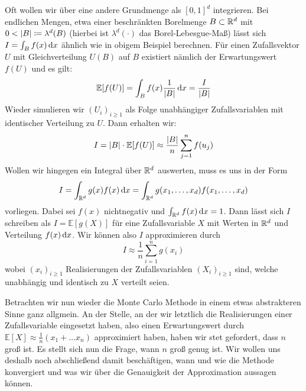  	Oft wollen wir über eine andere Grundmenge als $ [0,1]^d $ integrieren. 
 	Bei endlichen Mengen, etwa einer beschränkten Borelmenge $ B \subset \mathbb{R}^d $ mit $ 0 < | B | \coloneqq \lambda^d(B) $ (hierbei ist $ \lambda^d(\cdot) $ das Borel-Lebesgue-Maß) lässt sich $ I = \int_{B} f(x) \, \mathrm{d} x $ ähnlich wie in obigem Beispiel berechnen.
	Für einen Zufallsvektor $ U $ mit Gleichverteilung $ U(B) $ auf $ B $ existiert nämlich der Erwartungswert $ f(U) $ und es gilt:
	\[
		\mathbb{E}[f(U)] = \int_{B} f(x) \frac{1}{| B |} \, \mathrm{d} x = \frac{I}{| B |}
	\]
	Wieder simulieren wir $ (U_i)_{i \geq 1} $ als Folge unabhängiger Zufallsvariablen mit identischer Verteilung zu $ U $. Dann erhalten wir:
	\[
		I = | B | \cdot \mathbb{E}[f(U)] \approx \frac{| B |}{n} \sum_{j=1}^{n}f(u_j)
	\]
	 Wollen wir hingegen ein Integral über $ \mathbb{R}^d $ auswerten, muss es uns in der Form 
	\[
	I = \int_{\mathbb{R}^d} g(x)f(x) \, \mathrm{d} x = \int_{\mathbb{R}^d} g(x_1,\dots,x_d)f(x_1,\dots,x_d)
	\] 
	vorliegen. Dabei sei $ f(x) $ nichtnegativ und $ \int_{\mathbb{R}^d} f(x) \, \mathrm{d} x = 1 $.
	Dann lässt sich $ I $ schreiben als $ I = \mathbb{E}[g(X)] $ für eine Zufallsvariable $ X $ mit Werten in $ \mathbb{R}^d $ und Verteilung $ f(x) \, \mathrm{d} x $.
	Wir können also $ I $ approximieren durch
	\[
		I \approx \frac{1}{n}\sum_{i=1}^{n} g(x_i) 
	\]
	wobei $ (x_i)_{i \geq 1} $ Realisierungen der Zufallsvariablen $ (X_i)_{i \geq 1} $ sind, welche unabhängig und identisch zu $ X $ verteilt seien.
	
	Betrachten wir nun wieder die Monte Carlo Methode in einem etwas abstrakteren Sinne ganz allgmein.
	An der Stelle, an der wir letztlich die Realisierungen einer Zufallsvariable eingesetzt haben, also einen Erwartungswert durch $
	\mathbb{E}[X] \approx \frac{1}{n}(x_1 + \dots x_n)
	$ approximiert haben, haben wir stet gefordert, dass $ n $ groß ist. 
	Es stellt sich nun die Frage, wann $ n $ groß genug ist.
	Wir wollen uns deshalb noch abschließend damit beschäftigen, wann und wie die Methode konvergiert und was wir über die Genauigkeit der Approximation aussagen können.
